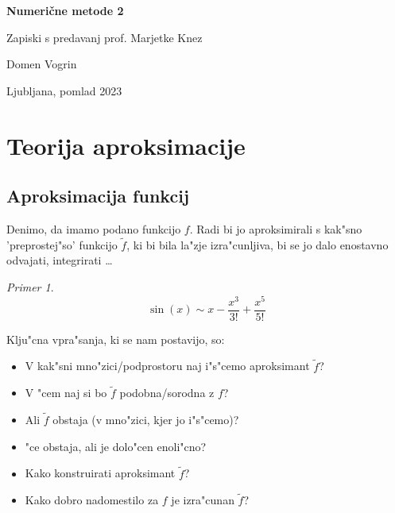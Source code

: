 \documentclass[a4paper,12pt]{article}
\theoremstyle{definition}
\theoremstyle{remark}
\newtheorem*{ex}{Primer}
\begin{document}

\begin{titlepage}
    \begin{center}
        
        \vspace*{3cm}
            
        \Huge
        \textbf{Numerične metode 2}

        \large
        Zapiski s predavanj prof. Marjetke Knez

        \vspace*{0.5cm}
        \LARGE
        Domen Vogrin

        \vfill
        \normalsize
        Ljubljana, pomlad 2023
    \end{center}

\end{titlepage}

\clearpage

\tableofcontents
\newpage
{}


\section{Teorija aproksimacije}

\subsection{Aproksimacija funkcij}
Denimo, da imamo podano funkcijo $f$. Radi bi jo aproksimirali s kak"sno 'preprostej"so' funkcijo $\tilde{f}$, ki bi bila la"zje izra"cunljiva, bi se jo dalo enostavno odvajati, integrirati \dots

\begin{ex}
    \[\sin(x) \sim x - \frac{x^3}{3!} + \frac{x^5}{5!}\]
\end{ex}


Klju"cna vpra"sanja, ki se nam postavijo, so:
\begin{itemize}
    \item V kak"sni mno"zici/podprostoru naj i"s"cemo aproksimant $\tilde{f}$?
    \item V "cem naj si bo $\tilde{f}$ podobna/sorodna z $f$?
    \item Ali $\tilde{f}$ obstaja (v mno"zici, kjer jo i"s"cemo)?
    \item "ce obstaja, ali je dolo"cen enoli"cno?
    \item Kako konstruirati aproksimant $\tilde{f}$?
    \item Kako dobro nadomestilo za $f$ je izra"cunan $\tilde{f}$?
\end{itemize}
\end{document}
